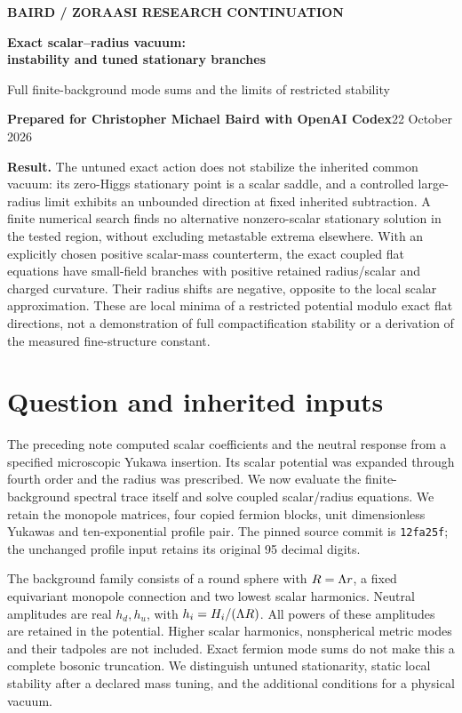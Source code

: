 \documentclass[11pt,letterpaper]{article}
\begin{document}
\thispagestyle{plain}
{\small\bfseries\color{teal} BAIRD / ZORAASI RESEARCH CONTINUATION}\par
{\LARGE\bfseries\color{navy} Exact scalar--radius vacuum:\\ instability and tuned stationary branches}\par
{\large Full finite-background mode sums and the limits of restricted stability}\par
\textbf{Prepared for Christopher Michael Baird with OpenAI Codex}\hfill 22 October 2026

\colorbox{pale}{\parbox{\dimexpr\linewidth-2\fboxsep\relax}{\textbf{Result.} The untuned exact action does not stabilize the inherited common vacuum: its zero-Higgs stationary point is a scalar saddle, and a controlled large-radius limit exhibits an unbounded direction at fixed inherited subtraction. A finite numerical search finds no alternative nonzero-scalar stationary solution in the tested region, without excluding metastable extrema elsewhere. With an explicitly chosen positive scalar-mass counterterm, the exact coupled flat equations have small-field branches with positive retained radius/scalar and charged curvature. Their radius shifts are negative, opposite to the local scalar approximation. These are local minima of a restricted potential modulo exact flat directions, not a demonstration of full compactification stability or a derivation of the measured fine-structure constant.}}

\section{Question and inherited inputs}

The preceding note \cite{exact} computed scalar coefficients and the neutral response from a specified microscopic Yukawa insertion. Its scalar potential was expanded through fourth order and the radius was prescribed. We now evaluate the finite-background spectral trace itself and solve coupled scalar/radius equations. We retain the monopole matrices, four copied fermion blocks, unit dimensionless Yukawas and ten-exponential profile pair. The pinned source commit is \texttt{12fa25f}; the unchanged profile input retains its original 95 decimal digits.

The background family consists of a round sphere with $R=\Lambda r$, a fixed equivariant monopole connection and two lowest scalar harmonics. Neutral amplitudes are real $h_d,h_u$, with $h_i=H_i/(\Lambda R)$. All powers of these amplitudes are retained in the potential. Higher scalar harmonics, nonspherical metric modes and their tadpoles are not included. Exact fermion mode sums do not make this a complete bosonic truncation. We distinguish untuned stationarity, static local stability after a declared mass tuning, and the additional conditions for a physical vacuum.
\end{document}

